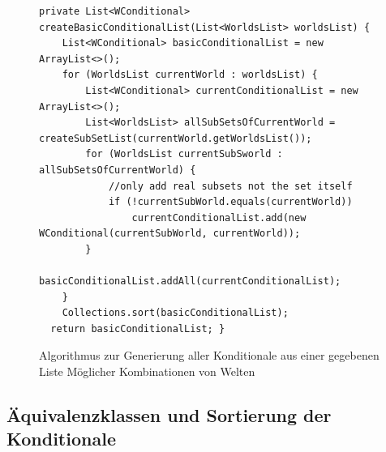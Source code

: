 \documentclass[12pt,a4paper]{article}
\begin{document}
\begin{figure}
\begin{lstlisting}
private List<WConditional> createBasicConditionalList(List<WorldsList> worldsList) {
    List<WConditional> basicConditionalList = new ArrayList<>();
    for (WorldsList currentWorld : worldsList) {
        List<WConditional> currentConditionalList = new ArrayList<>();
        List<WorldsList> allSubSetsOfCurrentWorld = createSubSetList(currentWorld.getWorldsList());
        for (WorldsList currentSubSworld : allSubSetsOfCurrentWorld) {
            //only add real subsets not the set itself
            if (!currentSubWorld.equals(currentWorld))
                currentConditionalList.add(new WConditional(currentSubWorld, currentWorld));
        }
        basicConditionalList.addAll(currentConditionalList);
    }
    Collections.sort(basicConditionalList);
  return basicConditionalList; }
\end{lstlisting}
\caption{Algorithmus zur Generierung aller Konditionale aus einer gegebenen Liste Möglicher Kombinationen von Welten}
\label{code:create-conditionals}
\end{figure} 


\subsection{Äquivalenzklassen und Sortierung der Konditionale}

\label{sec:equivalence}
\end{document}
